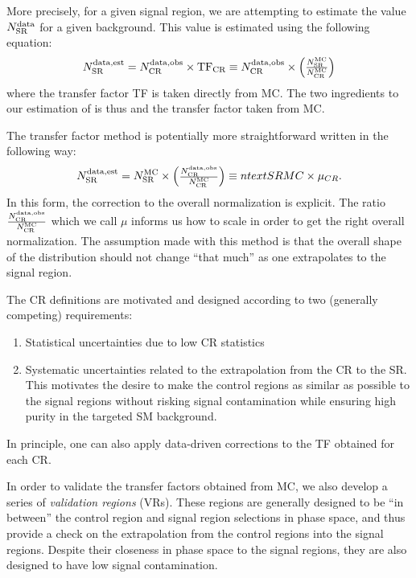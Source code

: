 More precisely, for a given signal region, we are attempting to estimate the value $\ntext{SR}{data}$ for a given background.
This value is estimated using the following equation:
\begin{align}\label{eq:bkg_est}
\ntext{SR}{data,est} = \ntext{CR}{data,obs} \times \text{TF}_{\text{CR}} \equiv \ntext{CR}{data,obs} \times  \begin{pmatrix} \frac{ \ntext{SR}{MC} }{ \ntext{CR}{MC} } \end{pmatrix}
\end{align}
where the transfer factor TF is taken directly from MC.
The two ingredients to our estimation of  is thus  and the transfer factor taken from MC.

The transfer factor method is potentially more straightforward written in the following way:
\begin{align}\label{eq:bkg_est_simple}
\ntext{SR}{data,est} = \ntext{SR}{MC} \times  \begin{pmatrix} \frac{\ntext{CR}{data,obs}  }{ \ntext{CR}{MC} } \end{pmatrix} \equiv ntext{SR}{MC} \times \mu_{CR}.
\end{align}
In this form, the correction to the overall normalization is explicit.
The ratio $\frac{\ntext{CR}{data,obs}}{ \ntext{CR}{MC} }$ which we call $\mu$ informs us how to scale  in order to get the right overall normalization.
The assumption made with this method is that the overall shape of the distribution should not change ``that much'' as one extrapolates to the signal region.

The CR definitions are motivated and designed according to two (generally competing) requirements:
\begin{enumerate}
\item Statistical uncertainties due to low CR statistics
\item Systematic uncertainties related to the extrapolation from the CR to the SR.  This motivates the desire to make the control regions as similar as possible to the signal regions without risking signal contamination while ensuring high purity in the targeted SM background.
\end{enumerate}
In principle, one can also apply data-driven corrections to the TF obtained for each CR.

In order to validate the transfer factors obtained from MC, we also develop a series of \textit{validation regions} (VRs).
These regions are generally designed to be ``in between'' the control region and signal region selections in phase space, and thus provide a check on the extrapolation from the control regions into the signal regions.
Despite their closeness in phase space to the signal regions, they are also designed to have low signal contamination.

